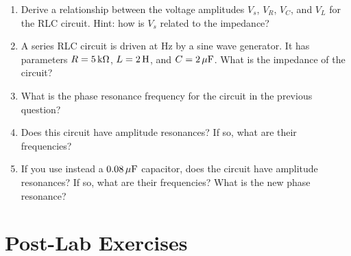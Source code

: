 \documentclass[12pt]{article}
\begin{document}
\begin{enumerate}
\item Derive a relationship between the voltage amplitudes $V_s$,
  $V_R$, $V_C$, and $V_L$ for the RLC circuit.  Hint: how is $V_s$
  related to the impedance?
\item A series RLC circuit is driven at \unit[500]{Hz} by a sine wave
  generator.  It has parameters $R=\unit[5]{k\Omega}$, $L =
  \unit[2]{H}$, and $C = \unit[2]{\mu F}$.  What is the impedance of
  the circuit?
\item What is the phase resonance frequency for the circuit in the
  previous question?
\item Does this circuit have amplitude resonances?  If so, what are
  their frequencies?
\item If you use instead a $\unit[0.08]{\mu F}$ capacitor, does the
  circuit have amplitude resonances?  If so, what are their
  frequencies?  What is the new phase resonance?
\end{enumerate}

\newpage

\section*{Post-Lab Exercises}
\end{document}
